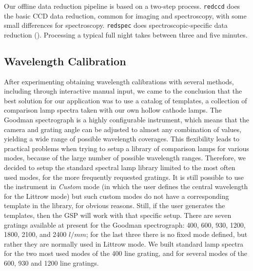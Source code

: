 \documentclass[11pt,twoside]{article}
\begin{document}
Our offline data reduction pipeline is based on a two-step process. \verb=redccd= does the basic CCD data reduction, common for imaging and spectroscopy, with some small differences for spectroscopy. \verb=redspec= does spectroscopic-specific data reduction (\citet{2013pss2.book...35M}). Processing a typical full night takes between three and five minutes.

\subsection{Wavelength Calibration}

After experimenting obtaining wavelength calibrations with several methods, including through interactive manual input, we came to the conclusion that the best solution for our application was to use a catalog of templates, a collection of comparison lamp spectra taken with our own hollow cathode lamps. The Goodman spectrograph is a highly configurable instrument, which means that the camera and grating angle can be adjusted to almost any combination of values, yielding a wide range of possible wavelength coverages. This flexibility leads to practical problems when trying to setup a library of comparison lamps for various modes, because of the large number of possible wavelength ranges.  Therefore, we decided to setup the standard spectral lamp library limited to the most often used modes, for the more frequently requested gratings. It is still possible to use the instrument in \emph{Custom} mode (in which the user defines the central wavelength for the Littrow mode) but such custom modes do not have a corresponding template in the library, for obvious reasons. Still, if the user generates the templates, then the GSP will work with that specific setup. There are seven gratings available at present for the Goodman spectrograph: 400, 600, 930, 1200, 1800, 2100, and 2400 $l/mm$; for the last three there is no fixed mode defined, but rather they are normally used in Littrow mode. We built standard lamp spectra for the two most used modes of the 400 line grating, and for several modes of the 600, 930 and 1200 line gratings.
\end{document}
